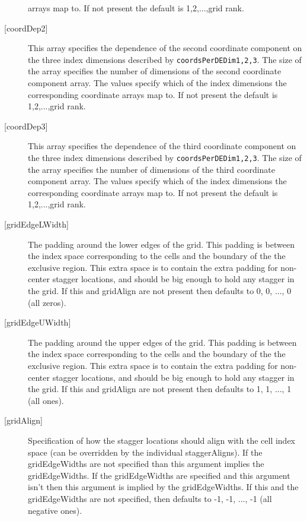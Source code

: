 \begin{description}
       arrays map to. If not present the default is 1,2,...,grid rank.
   \item[{[coordDep2]}]
       This array specifies the dependence of the second
       coordinate component on the three index dimensions
       described by {\tt coordsPerDEDim1,2,3}. The size of the
       array specifies the number of dimensions of the second
       coordinate component array. The values specify which
       of the index dimensions the corresponding coordinate
       arrays map to. If not present the default is 1,2,...,grid rank.
   \item[{[coordDep3]}]
       This array specifies the dependence of the third
       coordinate component on the three index dimensions
       described by {\tt coordsPerDEDim1,2,3}. The size of the
       array specifies the number of dimensions of the third
       coordinate component array. The values specify which
       of the index dimensions the corresponding coordinate
       arrays map to. If not present the default is 1,2,...,grid rank.
   \item[{[gridEdgeLWidth]}]
        The padding around the lower edges of the grid. This padding is between
        the index space corresponding to the cells and the boundary of the
        the exclusive region. This extra space is to contain the extra
        padding for non-center stagger locations, and should be big enough
        to hold any stagger in the grid. If this and gridAlign are not present then
        defaults to 0, 0, ..., 0 (all zeros).
   \item[{[gridEdgeUWidth]}]
        The padding around the upper edges of the grid. This padding is between
        the index space corresponding to the cells and the boundary of the
        the exclusive region. This extra space is to contain the extra
        padding for non-center stagger locations, and should be big enough
        to hold any stagger in the grid. If this and gridAlign are not present then
        defaults to 1, 1, ..., 1 (all ones).
   \item[{[gridAlign]}]
       Specification of how the stagger locations should align with the cell
       index space (can be overridden by the individual staggerAligns). If
       the gridEdgeWidths are not specified than this argument
       implies the gridEdgeWidths. If the gridEdgeWidths are specified and this argument isn't
       then this argument is implied by the gridEdgeWidths.
       If this and the gridEdgeWidths are not specified, then defaults to
      -1, -1, ..., -1 (all negative ones).

\end{description}

